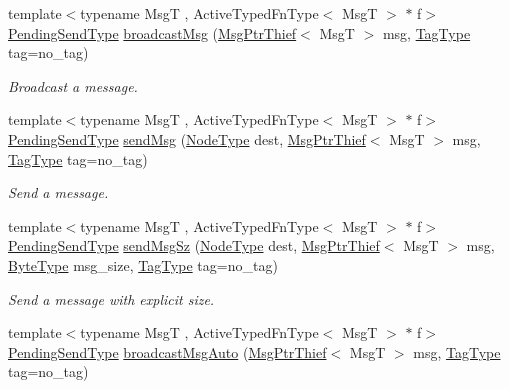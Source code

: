 \begin{DoxyCompactItemize}
{\footnotesize template$<$typename MsgT , Active\+Typed\+Fn\+Type$<$ Msg\+T $>$ $\ast$ f$>$ }\\\hyperlink{structvt_1_1messaging_1_1_active_messenger_a3626a6ca76d8ad4ec7c3b47a2c70d3a8}{Pending\+Send\+Type} \hyperlink{group__typesafehan_ga344802a09eb0e88006900976d1dfa204}{broadcast\+Msg} (\hyperlink{structvt_1_1messaging_1_1_msg_ptr_thief}{Msg\+Ptr\+Thief}$<$ MsgT $>$ msg, \hyperlink{namespacevt_a84ab281dae04a52a4b243d6bf62d0e52}{Tag\+Type} tag=no\+\_\+tag)
\begin{DoxyCompactList}\small\item\em Broadcast a message. \end{DoxyCompactList}\item 
{\footnotesize template$<$typename MsgT , Active\+Typed\+Fn\+Type$<$ Msg\+T $>$ $\ast$ f$>$ }\\\hyperlink{structvt_1_1messaging_1_1_active_messenger_a3626a6ca76d8ad4ec7c3b47a2c70d3a8}{Pending\+Send\+Type} \hyperlink{group__typesafehan_ga29a784965d1a87bc4abc44f225f40e79}{send\+Msg} (\hyperlink{namespacevt_a866da9d0efc19c0a1ce79e9e492f47e2}{Node\+Type} dest, \hyperlink{structvt_1_1messaging_1_1_msg_ptr_thief}{Msg\+Ptr\+Thief}$<$ MsgT $>$ msg, \hyperlink{namespacevt_a84ab281dae04a52a4b243d6bf62d0e52}{Tag\+Type} tag=no\+\_\+tag)
\begin{DoxyCompactList}\small\item\em Send a message. \end{DoxyCompactList}\item 
{\footnotesize template$<$typename MsgT , Active\+Typed\+Fn\+Type$<$ Msg\+T $>$ $\ast$ f$>$ }\\\hyperlink{structvt_1_1messaging_1_1_active_messenger_a3626a6ca76d8ad4ec7c3b47a2c70d3a8}{Pending\+Send\+Type} \hyperlink{group__typesafehan_gaac9ca3dd1b23d8df47166546341ab046}{send\+Msg\+Sz} (\hyperlink{namespacevt_a866da9d0efc19c0a1ce79e9e492f47e2}{Node\+Type} dest, \hyperlink{structvt_1_1messaging_1_1_msg_ptr_thief}{Msg\+Ptr\+Thief}$<$ MsgT $>$ msg, \hyperlink{namespacevt_aab8d55968084610ce3b17057981e9300}{Byte\+Type} msg\+\_\+size, \hyperlink{namespacevt_a84ab281dae04a52a4b243d6bf62d0e52}{Tag\+Type} tag=no\+\_\+tag)
\begin{DoxyCompactList}\small\item\em Send a message with explicit size. \end{DoxyCompactList}\item 
{\footnotesize template$<$typename MsgT , Active\+Typed\+Fn\+Type$<$ Msg\+T $>$ $\ast$ f$>$ }\\\hyperlink{structvt_1_1messaging_1_1_active_messenger_a3626a6ca76d8ad4ec7c3b47a2c70d3a8}{Pending\+Send\+Type} \hyperlink{group__typesafehan_ga7a5d96676fde771a9ce5af119796fb3a}{broadcast\+Msg\+Auto} (\hyperlink{structvt_1_1messaging_1_1_msg_ptr_thief}{Msg\+Ptr\+Thief}$<$ MsgT $>$ msg, \hyperlink{namespacevt_a84ab281dae04a52a4b243d6bf62d0e52}{Tag\+Type} tag=no\+\_\+tag)

\end{DoxyCompactItemize}
